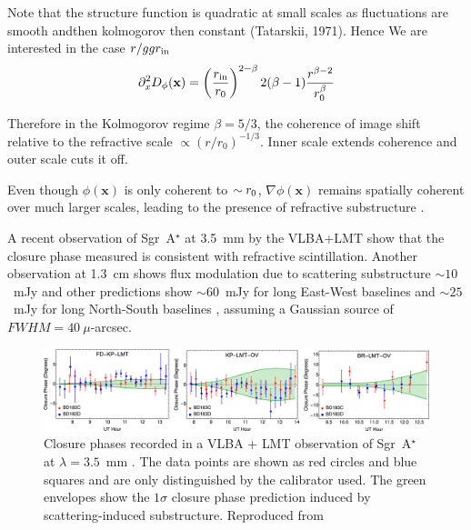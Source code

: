 Note that the structure function is quadratic at small scales as fluctuations are smooth andthen kolmogorov then constant (Tatarskii, 1971).
Hence We are interested in the case $r /gg r_{\rm in}$
\begin{equation}
\partial_x^2 D_\phi(\mathbf{x})= \left(\frac{r_{\rm in}}{r_0}\right)^{2-\beta}  2(\beta -1)  \frac{r^{\beta-2}}{r_0^\beta}
\end{equation}

Therefore in the Kolmogorov regime $\beta = 5/3$, the coherence of image shift relative to the refractive scale $\propto (r/r_0)^{-1/3}$. Inner scale extends coherence and outer scale cuts it off.


Even though $\phi(\mathbf{x})$ is only coherent to $\sim r_{\rm 0}$, $\nabla \phi(\mathbf{x})$ remains spatially coherent over much larger scales, leading to the presence of refractive substructure \citep*{Johnson_2015a}. 


A recent observation of Sgr~A$^\star$ at 3.5~mm by the VLBA+LMT \citep[see Fig.~ref{fig:substructure2}][]{Ortiz_2016} show that the closure phase measured is consistent with refractive scintillation. Another observation at 1.3~cm shows flux modulation due to scattering substructure $\sim 10$~mJy \citep{Gwinn_2014} and other predictions show $\sim 60$~mJy for long East-West baselines and $\sim 25$~mJy for long North-South baselines \citep*{Johnson_2015a}, assuming a Gaussian source of $FWHM=40\ \mu$-arcsec.

\begin{figure}
\begin{center}
\includegraphics[width=\columnwidth]{Images/ism_cp}
\caption{Closure phases recorded in a VLBA + LMT observation of  Sgr~A$^\star$ at $\lambda = 3.5$~mm \cite{Ortiz_2016}. The data points are shown as red circles and blue squares and are only distinguished by the calibrator used. The green envelopes show the $1\sigma$ closure phase prediction induced by scattering-induced substructure. Reproduced from \citet{Ortiz_2016} \label{fig:substructure2}
}
\end{center}
\end{figure}


